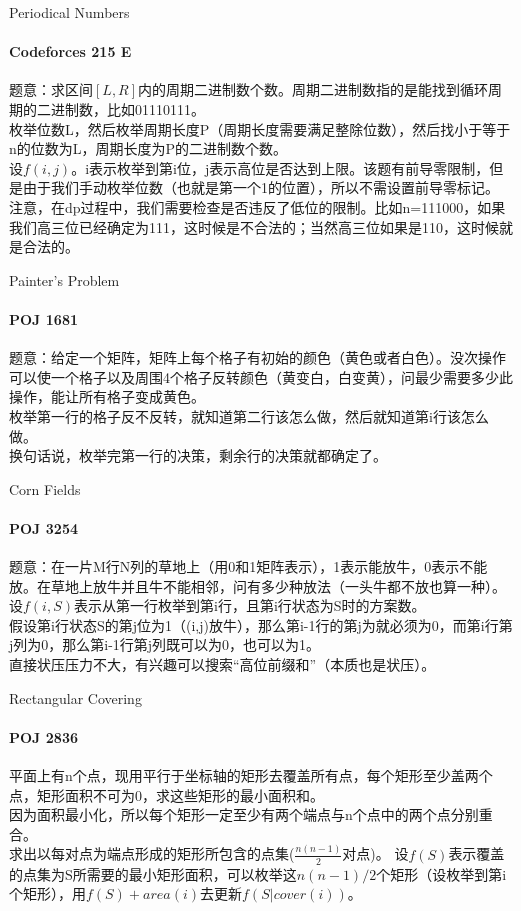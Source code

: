 \documentclass[hyperref={unicode=true}]{beamer}
\theoremstyle{definition}
\theoremstyle{proof}
\begin{document}
\begin{frame}{Periodical Numbers}
  \framesubtitle{Codeforces 215 E}
  题意：求区间$[L,R]$内的周期二进制数个数。周期二进制数指的是能找到循环周期的二进制数，比如01110111。\\
  枚举位数L，然后枚举周期长度P（周期长度需要满足整除位数），然后找小于等于n的位数为L，周期长度为P的二进制数个数。\\
  设$f(i,j)$。i表示枚举到第i位，j表示高位是否达到上限。该题有前导零限制，但是由于我们手动枚举位数（也就是第一个1的位置），所以不需设置前导零标记。\\
  注意，在dp过程中，我们需要检查是否违反了低位的限制。比如n=111000，如果我们高三位已经确定为111，这时候是不合法的；当然高三位如果是110，这时候就是合法的。
\end{frame}

\begin{frame}{Painter's Problem}
  \framesubtitle{POJ 1681}
  题意：给定一个矩阵，矩阵上每个格子有初始的颜色（黄色或者白色）。没次操作可以使一个格子以及周围4个格子反转颜色（黄变白，白变黄），问最少需要多少此操作，能让所有格子变成黄色。\\
  枚举第一行的格子反不反转，就知道第二行该怎么做，然后就知道第i行该怎么做。\\
  换句话说，枚举完第一行的决策，剩余行的决策就都确定了。
\end{frame}

\begin{frame}{Corn Fields}
  \framesubtitle{POJ 3254}
  题意：在一片M行N列的草地上（用0和1矩阵表示），1表示能放牛，0表示不能放。在草地上放牛并且牛不能相邻，问有多少种放法（一头牛都不放也算一种）。\\
  设$f(i,S)$表示从第一行枚举到第i行，且第i行状态为S时的方案数。\\
  假设第i行状态S的第j位为1（(i,j)放牛），那么第i-1行的第j为就必须为0，而第i行第j列为0，那么第i-1行第j列既可以为0，也可以为1。\\
  直接状压压力不大，有兴趣可以搜索“高位前缀和”（本质也是状压）。
\end{frame}

\begin{frame}{Rectangular Covering}
  \framesubtitle{POJ 2836}
  平面上有n个点，现用平行于坐标轴的矩形去覆盖所有点，每个矩形至少盖两个点，矩形面积不可为0，求这些矩形的最小面积和。\\
  因为面积最小化，所以每个矩形一定至少有两个端点与n个点中的两个点分别重合。\\
  求出以每对点为端点形成的矩形所包含的点集($\frac{n(n-1)}{2}$对点)。
  设$f(S)$表示覆盖的点集为S所需要的最小矩形面积，可以枚举这$n(n-1)/2$个矩形（设枚举到第i个矩形），用$f(S)+area(i)$去更新$f(S|cover(i))$。
\end{frame}
\end{document}
